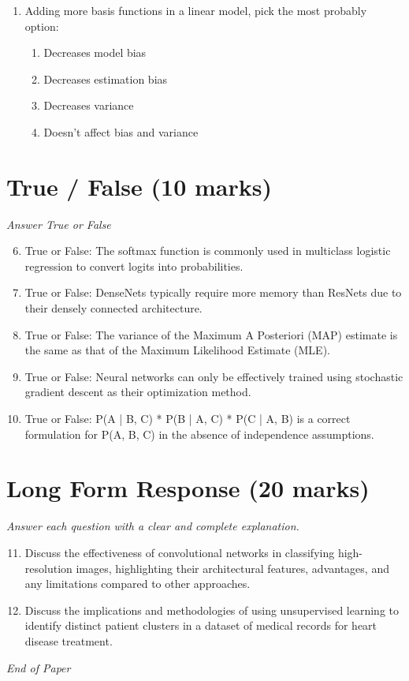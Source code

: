 \documentclass[12pt]{article}
\begin{document}
\begin{enumerate}[label=\arabic*.]
\begin{enumerate}[label=(\alph*)]
    \item P(X, Y, Z) = P(Y) * P(X|Y) * P(Z|Y)
    \item P(X, Y, Z) = P(X) * P(Y|X) * P(Z|Y)
    \item P(X, Y, Z) = P(Z) * P(X|Z) * P(Y|Z)
    \item P(X, Y, Z) = P(X) * P(Y) * P(Z)
\end{enumerate}
\item Adding more basis functions in a linear model, pick the most probably option:
\begin{enumerate}[label=(\alph*)]
    \item Decreases model bias
    \item Decreases estimation bias
    \item Decreases variance
    \item Doesn't affect bias and variance
\end{enumerate}
\end{enumerate}

\section*{True / False (10 marks)}
\textit{Answer True or False}
\begin{enumerate}[label=\arabic*.]
\setcounter{enumi}{5}
\item True or False: The softmax function is commonly used in multiclass logistic regression to convert logits into probabilities.
\item True or False: DenseNets typically require more memory than ResNets due to their densely connected architecture.
\item True or False: The variance of the Maximum A Posteriori (MAP) estimate is the same as that of the Maximum Likelihood Estimate (MLE).
\item True or False: Neural networks can only be effectively trained using stochastic gradient descent as their optimization method.
\item True or False: P(A | B, C) * P(B | A, C) * P(C | A, B) is a correct formulation for P(A, B, C) in the absence of independence assumptions.
\end{enumerate}

\section*{Long Form Response (20 marks)}
\textit{Answer each question with a clear and complete explanation.}
\begin{enumerate}[label=\arabic*.]
\setcounter{enumi}{10}
\item Discuss the effectiveness of convolutional networks in classifying high-resolution images, highlighting their architectural features, advantages, and any limitations compared to other approaches.
\item Discuss the implications and methodologies of using unsupervised learning to identify distinct patient clusters in a dataset of medical records for heart disease treatment.
\end{enumerate}

\vfill
\noindent\textit{End of Paper}
\end{document}

